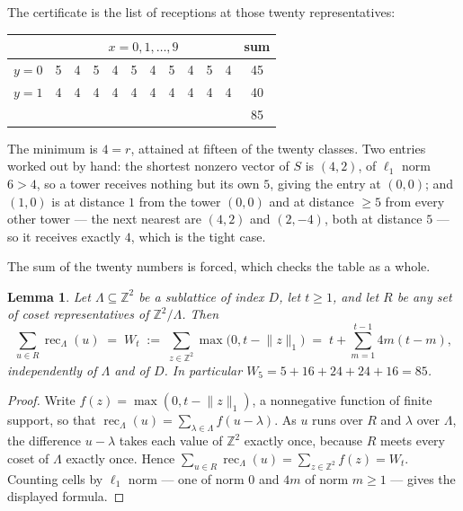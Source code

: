 \documentclass[11pt]{amsart}
\newtheorem{lemma}[theorem]{Lemma}
\theoremstyle{remark}
\newcommand{\ZZ}{\mathbb{Z}}
\newcommand{\rec}{\operatorname{rec}}
\begin{document}
The certificate is the list of receptions at those twenty
representatives:
\begin{center}
\begin{tabular}{c|cccccccccc|c}
 & \multicolumn{10}{c|}{$x=0,1,\ldots,9$} & sum\\\hline
 $y=0$ & 5&4&5&4&5&4&5&4&5&4 & 45\\
 $y=1$ & 4&4&4&4&4&4&4&4&4&4 & 40\\\hline
 \multicolumn{11}{c}{} & 85
\end{tabular}
\end{center}
The minimum is $4=r$, attained at fifteen of the twenty classes. Two entries
worked out by hand: the shortest nonzero vector of $S$ is $(4,2)$, of
$\ell_1$ norm $6>4$, so a tower receives nothing but its own $5$, giving the
entry at $(0,0)$; and $(1,0)$ is at distance $1$ from the tower $(0,0)$ and at
distance $\ge5$ from every other tower --- the next nearest are $(4,2)$ and
$(2,-4)$, both at distance $5$ --- so it receives exactly $4$, which is the
tight case.

The sum of the twenty numbers is forced, which checks the table as a whole.

\begin{lemma}\label{lem:checksum}
Let $\Lambda\subseteq\ZZ^2$ be a sublattice of index $D$, let $t\ge1$, and let
$R$ be any set of coset representatives of $\ZZ^2/\Lambda$. Then
\[
 \sum_{u\in R}\rec_\Lambda(u)\;=\;W_t
 \;:=\;\sum_{z\in\ZZ^2}\max\bigl(0,t-\lVert z\rVert_1\bigr)
 \;=\;t+\sum_{m=1}^{t-1}4m(t-m),
\]
independently of $\Lambda$ and of $D$. In particular $W_5=5+16+24+24+16=85$.
\end{lemma}

\begin{proof}
Write $f(z)=\max(0,t-\lVert z\rVert_1)$, a nonnegative function of finite
support, so that $\rec_\Lambda(u)=\sum_{\lambda\in\Lambda}f(u-\lambda)$. As $u$
runs over $R$ and $\lambda$ over $\Lambda$, the difference $u-\lambda$ takes
each value of $\ZZ^2$ exactly once, because $R$ meets every coset of $\Lambda$
exactly once. Hence $\sum_{u\in R}\rec_\Lambda(u)=\sum_{z\in\ZZ^2}f(z)=W_t$.
Counting cells by $\ell_1$ norm --- one of norm $0$ and $4m$ of norm $m\ge1$ ---
gives the displayed formula.
\end{proof}
\end{document}
